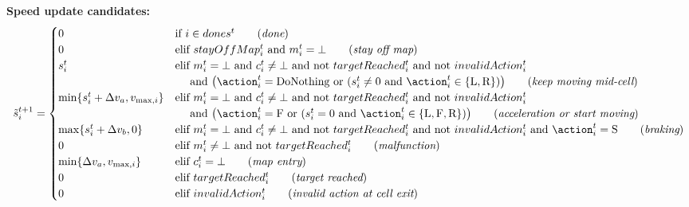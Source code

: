 \textbf{Speed update candidates:}
\begin{equation}
\tilde{s}_i^{t+1} =
        \begin{cases}
            0 & \text{if } i \in dones^t \qquad (\textit{done}) \\
            0 & \text{elif } stayOffMap_i^t \text{ and } m_i^{t} = \bot \qquad (\textit{stay off map}) \\
            s_i^t & \text{elif } m_i^{t} = \bot \text{ and } c_i^t \not= \bot \text{ and not } targetReached_i^t \text{ and not } invalidAction_i^t \\
                  & \quad \text{ and } \big(\action_i^t = \text{DoNothing} \text{ or } (s_i^t \not= 0 \text{ and } \action_i^t \in \{\text{L},\text{R}\})\big) \qquad (\textit{keep moving mid-cell}) \\
            \min\{s_i^{t}+\Delta{}v_a,v_{\text{max},i}\} & \text{elif } m_i^{t} = \bot \text{ and } c_i^t \not= \bot \text{ and not } targetReached_i^t \text{ and not } invalidAction_i^t \\
                  & \quad \text{ and } \big(\action_i^t = \text{F} \text{ or } (s_i^t = 0 \text{ and } \action_i^t \in \{\text{L},\text{F},\text{R}\})\big) \qquad (\textit{acceleration or start moving}) \\
            \max\{s_i^{t}+\Delta{}v_b,0\} & \text{elif } m_i^{t} = \bot \text{ and } c_i^t \not= \bot \text{ and not } targetReached_i^t \text{ and not } invalidAction_i^t \text{ and } \action_i^t = \text{S} \qquad (\textit{braking}) \\
            0 & \text{elif } m_i^{t} \not= \bot \text{ and not } targetReached_i^t \qquad (\textit{malfunction}) \\
            \min\{\Delta{}v_a,v_{\text{max},i}\} & \text{elif } c_i^t = \bot \qquad (\textit{map entry}) \\
            0 & \text{elif } targetReached_i^t \qquad (\textit{target reached}) \\
            0 & \text{elif } invalidAction_i^t \qquad (\textit{invalid action at cell exit}) \\
        \end{cases}
\end{equation}

